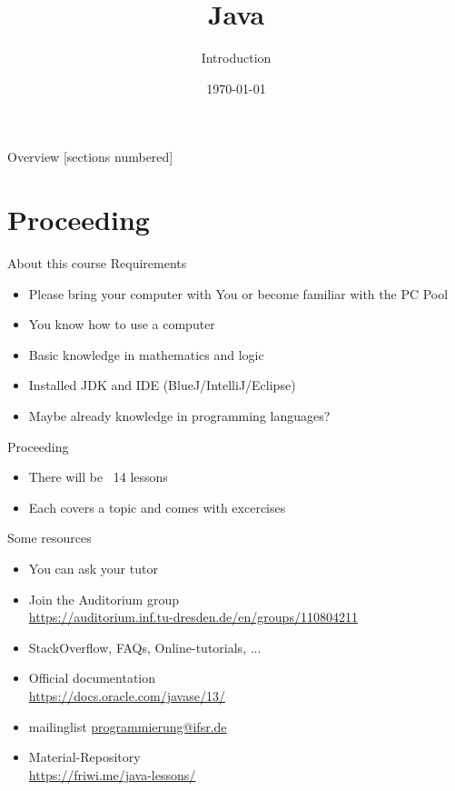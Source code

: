 


\title{Java}
\subtitle{Introduction}
\date{\today}




\begin{frame}
    \titlepage
\end{frame}
\begin{frame}{Overview}
    [sections numbered]
    \tableofcontents
\end{frame}

\section{Proceeding}
\begin{frame}{About this course}
    Requirements
    \begin{itemize}
               \item Please bring your computer with You or become familiar with the PC Pool
        \item You know how to use a computer
        \item Basic knowledge in mathematics and logic
                \item Installed JDK and IDE (BlueJ/IntelliJ/Eclipse)
        \item Maybe already knowledge in programming languages?
    \end{itemize}
    Proceeding
    \begin{itemize}
        \item There will be ~14 lessons
        \item Each covers a topic and comes with excercises
    \end{itemize}
\end{frame}

\begin{frame}{Some resources}
    \begin{itemize}
        \item You can ask your tutor
        \item Join the Auditorium group \hfill \\
            \url{https://auditorium.inf.tu-dresden.de/en/groups/110804211}
        \item StackOverflow, FAQs, Online-tutorials, ... \hfill \\
        \item Official documentation \hfill \\
            \url{https://docs.oracle.com/javase/13/}
           \item mailinglist \url{programmierung@ifsr.de}
    \item Material-Repository \\
        \url{https://friwi.me/java-lessons/}
    \end{itemize}
\end{frame}

